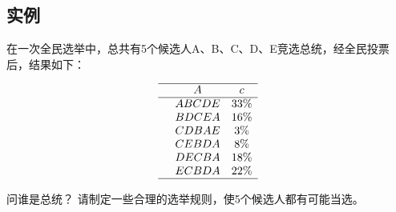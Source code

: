 \subsection{实例}

在一次全民选举中，总共有5个候选人A、B、C、D、E竞选总统，经全民投票后，结果如下：

$$
\begin{array}{cccc}
	\hline 
	& A  & c  \\
	\hline 
	& ABCDE  &  33\%  \\
	& BDCEA  &  16\%  \\
	& CDBAE  &  3\% \\
	& CEBDA  &  8\%\\
	& DECBA  &  18\%\\
	& ECBDA  &  22\% \\ 
	\hline
\end{array} $$

\vspace{0.5em}
问谁是总统？ 请制定一些合理的选举规则，使5个候选人都有可能当选。